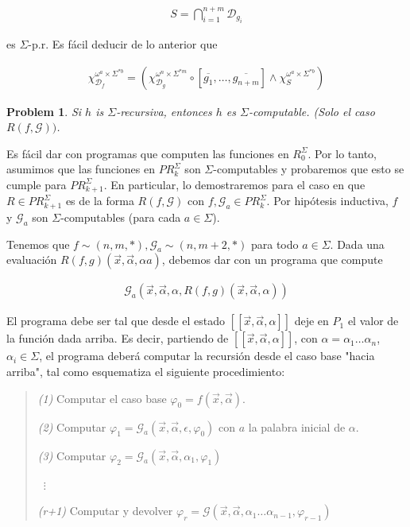 \documentclass[a4paper, 12pt]{article}
\newtheorem{problem}{Problem}
\newtheorem{problem}{Problem}
\begin{document}
\begin{align*}
    S = \bigcap_{i=1}^{n+m} \mathcal{D}_{g_i}
\end{align*}

es $\Sigma$-p.r. Es fácil deducir de lo anterior que 

\begin{align*}
    \chi_{\mathcal{D}_f}^{\omega^{a} \times \Sigma^{*b} } = \left(
    \chi_{\mathcal{D}_g}^{\omega^{n} \times \Sigma^{*m} } \circ \left[
\overline{g_1}, \ldots, \overline{g_{n+m}} \right]  \land  \chi_{S}^{\omega^{a} \times \Sigma^{*b} } \right) 
\end{align*}

\pagebreak

\begin{problem}
    Si $h$ is $\Sigma$-recursiva, entonces $h$ es $\Sigma$-computable. (Solo el
    caso $R(f, \mathcal{G}))$.
\end{problem}

Es fácil dar con programas que computen las funciones en $R_{0}^{\Sigma}$. Por
lo tanto, asumimos que las funciones en $PR_{k}^{\Sigma}$ son
$\Sigma$-computables y probaremos que esto se cumple para $PR_{k+1}^{\Sigma}$.
En particular, lo demostraremos para el caso en que $R \in PR_{k+1}^{\Sigma}$ es
de la forma $R(f, \mathcal{G})$ con $f, \mathcal{G}_a \in PR_{k}^{\Sigma}$.
Por hipótesis inductiva, $f$ y $\mathcal{G}_a$ son $\Sigma$-computables (para
cada $a \in \Sigma$).

Tenemos que $f \sim (n, m, *), \mathcal{G}_a \sim (n, m + 2, *)$ para todo $a
\in \Sigma$. Dada una evaluación $R(f, g)(\vec{x}, \vec{\alpha}, \alpha a)$,
debemos dar con un programa que compute

\begin{align*}
    \mathcal{G}_a \left( \vec{x}, \vec{\alpha}, \alpha, R(f, g)(\vec{x},
    \vec{\alpha}, \alpha) \right) 
\end{align*}

El programa debe ser tal que desde el estado $[\![ \vec{x}, \vec{\alpha},
\alpha  ]\!]$ deje en $P_1$ el valor de la función dada arriba. Es decir,
partiendo de $[\![ \vec{x}, \vec{\alpha}, \alpha ]\!]$, con $\alpha = \alpha_1
\ldots \alpha_n$, $\alpha_i \in \Sigma$, el programa deberá computar la
recursión desde el caso base "hacia arriba", tal como esquematiza el siguiente
procedimiento:

\begin{quote}
    \textit{(1)} Computar el caso base $\varphi_0 = f(\vec{x}, \vec{\alpha})$. 

    \textit{(2)} Computar $\varphi_1 = \mathcal{G}_a ( \vec{x}, \vec{\alpha}, \epsilon,
    \varphi_0 )$ con $a$ la palabra inicial de $\alpha$.

    \textit{(3)} Computar $\varphi_2 = \mathcal{G}_a \left( \vec{x},
    \vec{\alpha}, \alpha_1, \varphi_1 \right) $ 

       ~$\vdots$

       \textit{(r+1)} Computar y devolver $\varphi_r = \mathcal{G}(\vec{x}, \vec{\alpha},
       \alpha_1\ldots \alpha_{n-1}, \varphi_{r-1})$
\end{quote}
\end{document}
